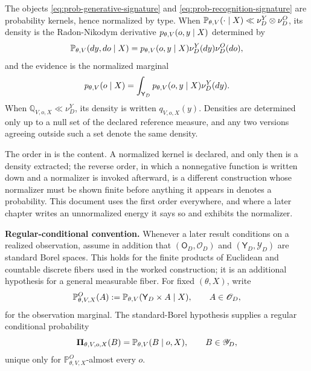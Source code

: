 \medskip
{}
The objects \eqref{eq:prob-generative-signature} and \eqref{eq:prob-recognition-signature} are probability kernels, hence normalized by type. When $\mathbb P_{\theta,V}(\cdot\mid X)\ll\nu^{Y}_{D}\otimes\nu^{O}_{D}$, its density is the Radon-Nikodym derivative $p_{\theta,V}(o,y\mid X)$ determined by
\begin{equation}
\mathbb P_{\theta,V}(dy,do\mid X)=p_{\theta,V}(o,y\mid X)\nu^{Y}_{D}(dy)\nu^{O}_{D}(do),
\label{eq:prob-generative-density}
\end{equation}
and the evidence is the normalized marginal
\begin{equation}
p_{\theta,V}(o\mid X)=\int_{\mathsf Y_D}p_{\theta,V}(o,y\mid X)\nu^{Y}_{D}(dy).
\label{eq:prob-evidence}
\end{equation}
When $\mathbb Q_{V,o,X}\ll\nu^{Y}_{D}$, its density is written $q_{V,o,X}(y)$. Densities are determined only up to a null set of the declared reference measure, and any two versions agreeing outside such a set denote the same density. 
\medskip

The order in  is the content. A normalized kernel is declared, and only then is a density extracted; the reverse order, in which a nonnegative function is written down and a normalizer is invoked afterward, is a different construction whose normalizer must be shown finite before anything it appears in denotes a probability. This document uses the first order everywhere, and where a later chapter writes an unnormalized energy it says so and exhibits the normalizer.

\medskip
\noindent\textbf{Regular-conditional convention.} Whenever a later result conditions on a realized observation, assume in addition that $(\mathsf O_D,\mathscr O_D)$ and $(\mathsf Y_D,\mathscr Y_D)$ are standard Borel spaces. This holds for the finite products of Euclidean and countable discrete fibers used in the worked construction; it is an additional hypothesis for a general measurable fiber. For fixed $(\theta,X)$, write
\begin{equation}
\mathbb P_{\theta,V,X}^{O}(A)
:=\mathbb P_{\theta,V}(\mathsf Y_D\times A\mid X),
\qquad A\in\mathscr O_D,
\label{eq:prob-observation-marginal}
\end{equation}
for the observation marginal. The standard-Borel hypothesis supplies a regular conditional probability
\begin{equation}
\boldsymbol\Pi_{\theta,V,o,X}(B)
=\mathbb P_{\theta,V}(B\mid o,X),
\qquad B\in\mathscr Y_D,
\label{eq:prob-rcp}
\end{equation}
unique only for $\mathbb P_{\theta,V,X}^{O}$-almost every $o$.

